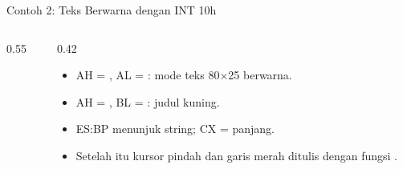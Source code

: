 \documentclass[aspectratio=169,11pt]{beamer}
\begin{document}
\begin{frame}[fragile]{Contoh 2: Teks Berwarna dengan INT 10h}
\begin{columns}[t]
\begin{column}{0.55\textwidth}
\end{column}
\begin{column}{0.42\textwidth}
\footnotesize
\begin{itemize}
    \item AH = , AL = : mode teks 80$\times$25
          berwarna.
    \item AH = , BL = : judul kuning.
    \item ES:BP menunjuk string; CX = panjang.
    \item Setelah itu kursor pindah dan garis merah ditulis dengan
          fungsi .
\end{itemize}
\end{column}
\end{columns}
\end{frame}
\end{document}
